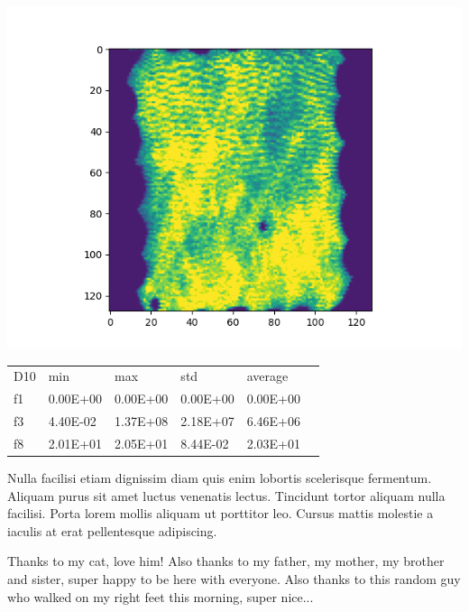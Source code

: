 {
\setlength{\columnsep}{30pt}
\begin{multicols*}{2}
{
    \begin{tikzfigure}
    \label{fig:fig1}
     \includegraphics[width=0.5\colwidth-75pt]{Figure/7100_0.png}
    \end{tikzfigure}
}
\pagebreak
{
\begin{tikztable}
    \begin{tabular}{llllll}
        D10 & min      & max      & std      & average  \\
        f1  & 0.00E+00 & 0.00E+00 & 0.00E+00 & 0.00E+00 \\
        f3  & 4.40E-02 & 1.37E+08 & 2.18E+07 & 6.46E+06 \\
        f8  & 2.01E+01 & 2.05E+01 & 8.44E-02 & 2.03E+01 \\
    \end{tabular}
\end{tikztable}

\vspace{5pt}

Nulla facilisi etiam dignissim diam quis enim lobortis scelerisque fermentum. Aliquam purus sit amet luctus venenatis lectus. Tincidunt tortor aliquam nulla facilisi. Porta lorem mollis aliquam ut porttitor leo. Cursus mattis molestie a iaculis at erat pellentesque adipiscing\cite{C03}.
}
\end{multicols*}
}

{
Thanks to my cat, love him! Also thanks to my father, my mother, my brother and sister, super happy to be here with everyone. Also thanks to this random guy who walked on my right feet this morning, super nice...
}

{
    \printbibliography[heading=none]
}

